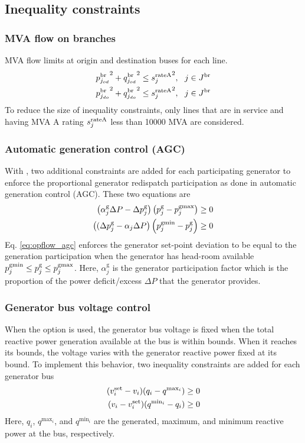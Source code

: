 \subsection{Inequality constraints}

\subsubsection{MVA flow on branches}
MVA flow limits at origin and destination buses for each line.
\begin{align}
  {p^\text{br}_{j_{od}}}^2 + {q^\text{br}_{j_{od}}}^2 \le {s^{\text{rateA}}_j}^2,~~j \in J^\text{br}\\
  {p^\text{br}_{j_{do}}}^2 + {q^\text{br}_{j_{do}}}^2 \le {s^{\text{rateA}}_j}^2,~~j \in J^\text{br}
\end{align}
To reduce the size of inequality constraints, only lines that are in service and having MVA A rating $s^{\text{rateA}}_j$ less than 10000 MVA are considered.

\subsubsection{Automatic generation control (AGC)}
With \option{\opflowuseagc}, two additional constraints are added for each participating generator to enforce the proportional generator redispatch participation as done in automatic generation control (AGC). These two equations are 
\begin{equation}
\begin{aligned}
  \left(\alpha^{\text{g}}_j\Delta{P} - \Delta{p}^\text{g}_j\right)\left(p^\text{g}_j - p^\text{gmax}_j\right) \ge 0 \\
  \left((\Delta{p}^\text{g}_j - \alpha_j\Delta{P}\right)\left(p^\text{gmin}_j - p^\text{g}_j\right) \ge 0
\end{aligned}
\label{eq:opflow_agc}
\end{equation}
Eq. \ref{eq:opflow_agc} enforces the generator set-point deviation to be equal to the generation participation when the generator has head-room available $p^\text{gmin}_j \le p^\text{g}_j \le p^\text{gmax}_j$. Here, $\alpha^{\text{g}}_j$ is the generator participation factor which is the proportion of the power deficit/excess $\Delta{P}$ that the generator provides.

\subsubsection{Generator bus voltage control}
When the option \opflowoption{\opflowgenbusvoltage~\fixedwithinqbounds} is used, the generator bus voltage is fixed when the total reactive power generation available at the bus is within bounds. When it reaches its bounds, the voltage varies with the generator reactive power fixed at its bound. To implement this behavior, two inequality constraints are added for each generator bus
\begin{equation}
\begin{aligned}
(v^{\text{set}}_i - v_i)(q_i - q^{\text{max}_i}) \ge 0 \\
(v_i - v^{\text{set}}_i)(q^{\text{min}_i} - q_i) \ge 0
\end{aligned}
\label{eq:opflow_genbusvoltage}
\end{equation}
Here, $q_i$, $q^{\text{max}_i}$, and $q^{\text{min}_i}$ are the generated, maximum, and minimum reactive power at the bus, respectively.

